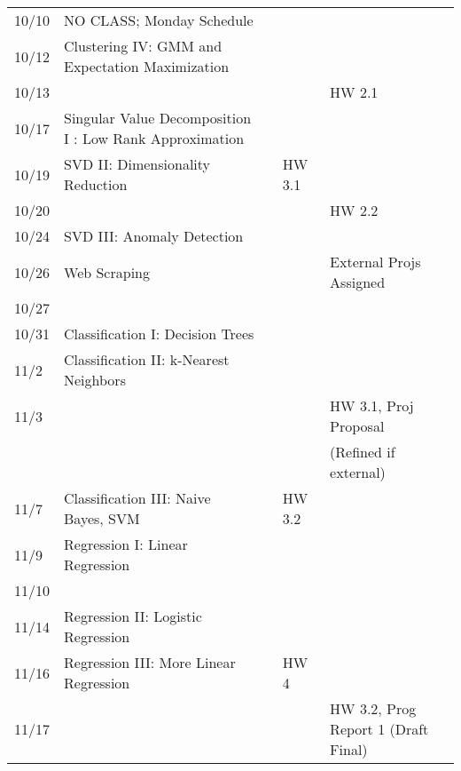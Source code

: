 \documentclass[11pt]{article}
\begin{document}
\begin{centering}
\begin{tabular}{||l|p{3in}|l|l|l||}
10/10 &  NO CLASS; Monday Schedule &  & &  \\   
10/12 & Clustering IV: GMM and Expectation Maximization & & & \\
10/13 &&&& HW 2.1 \\
\hline
10/17 & Singular Value Decomposition I : Low Rank Approximation &&&\\
10/19 & SVD II: Dimensionality Reduction & & HW 3.1 & \\ 
10/20 &&&& HW 2.2 \\

\hline

%
 10/24 & SVD III: Anomaly Detection & &  & \\ 
 10/26 & Web Scraping & & & External Projs Assigned\\ 
10/27 &&&& \\
\hline

 10/31 & Classification I: Decision Trees & &  &\\ 
11/2 & Classification II: k-Nearest Neighbors & & &\\ 
11/3 &&&& HW 3.1, Proj Proposal\\ &&&& (Refined if external)\\
\hline

11/7 & Classification III: Naive Bayes, SVM && HW 3.2 &\\ 
11/9 & Regression I: Linear Regression & & & \\ 
11/10 &&&& \\
\hline

11/14 & Regression II: Logistic Regression & & &\\ 
11/16 & Regression III: More Linear Regression & & HW 4 & \\
11/17 &&&& HW 3.2, Prog Report 1 (Draft Final)\\
\hline


\end{tabular}
\end{centering}
\end{document}
